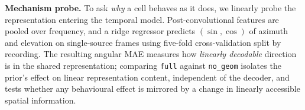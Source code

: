 \textbf{Mechanism probe.} To ask \emph{why} a cell behaves as it does, we linearly
probe the representation entering the temporal model. Post-convolutional features
are pooled over frequency, and a ridge regressor predicts $(\sin,\cos)$ of
azimuth and elevation on single-source frames using five-fold cross-validation
split by recording. The resulting angular MAE measures how \emph{linearly
decodable} direction is in the shared representation; comparing \texttt{full}
against \texttt{no\_geom} isolates the prior's effect on linear representation
content, independent of the decoder, and tests whether any behavioural effect is
mirrored by a change in linearly accessible spatial information.
